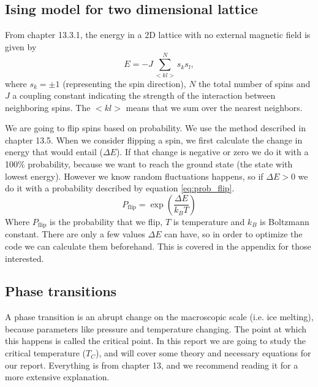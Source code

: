 \documentclass[reprint, english,notitlepage,nofootinbib]{revtex4-1}  %
\begin{document}
\subsection*{Ising model for two dimensional lattice} \label{sect:2by2Lattice}

From \cite{lectures2015} chapter 13.3.1, the energy in a 2D lattice with no external magnetic field is given by
\begin{equation}
	\label{eq:2D_energy}
	E = -J \sum_{<kl>}^{N}s_ks_l,
\end{equation}
where $s_k = \pm 1$ (representing the spin direction), $N$ the total number of spins and $J$ a coupling constant indicating the strength of the interaction between neighboring spins. The $<kl>$ means that we sum over the nearest neighbors.

We are going to flip spins based on probability. We use the method described in \cite{lectures2015} chapter 13.5. When we consider flipping a spin, we first calculate the change in energy that would entail ($\Delta E$). If that change is negative or zero we do it with a 100\% probability, because we want to reach the ground state (the state with lowest energy). However we know random fluctuations happens, so if $\Delta E > 0$ we do it with a probability described by equation \eqref{eq:prob_flip}.
\begin{equation}
	\label{eq:prob_flip}
	P_{\text{flip}} = \exp(\frac{\Delta E}{k_BT})
\end{equation}
Where $P_{\text{flip}}$ is the probability that we flip, $T$ is temperature and $k_B$ is Boltzmann constant. There are only a few values $\Delta E$ can have, so in order to optimize the code we can calculate them beforehand. This is covered in the appendix for those interested.

\subsection*{Phase transitions}

A phase transition is an abrupt change on the macroscopic scale (i.e. ice melting), because parameters like pressure and temperature changing. The point at which this happens is called the critical point. In this report we are going to study the critical temperature ($T_C$), and will cover some theory and necessary equations for our report. Everything is from \cite{lectures2015} chapter 13, and we recommend reading it for a more extensive explanation.
\end{document}
